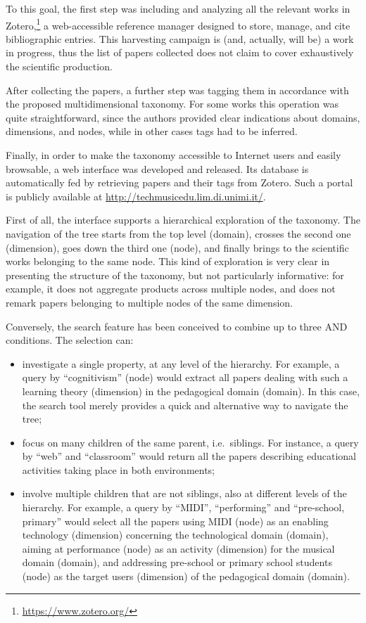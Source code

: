 \documentclass[10pt,journal,compsoc]{IEEEtran}
\begin{document}
To this goal, the first step was including and analyzing all the relevant works in Zotero,\footnote{\url{https://www.zotero.org/}} a web-accessible reference manager designed to store, manage, and cite bibliographic entries. This harvesting campaign is (and, actually, will be) a work in progress, thus the list of papers collected does not claim to cover exhaustively the scientific production.

After collecting the papers, a further step was tagging them in accordance with the proposed multidimensional taxonomy. For some works this operation was quite straightforward, since the authors provided clear indications about domains, dimensions, and nodes, while in other cases tags had to be inferred. 

Finally, in order to make the taxonomy accessible to Internet users and easily browsable, a web interface was developed and released. Its database is automatically fed by retrieving papers and their tags from Zotero. Such a portal is publicly available at \url{http://techmusicedu.lim.di.unimi.it/}.

First of all, the interface supports a hierarchical exploration of the taxonomy. The navigation of the tree starts from the top level (domain), crosses the second one (dimension), goes down the third one (node), and finally brings to the scientific works belonging to the same node. This kind of exploration is very clear in presenting the structure of the taxonomy, but not particularly informative: for example, it does not aggregate products across multiple nodes, and does not remark papers belonging to multiple nodes of the same dimension. 

Conversely, the search feature has been conceived to combine up to three AND conditions. The selection can:

\begin{itemize}
\item investigate a single property, at any level of the hierarchy. For example, a query by ``cognitivism'' (node) would extract all papers dealing with such a learning theory (dimension) in the pedagogical domain (domain). In this case, the search tool merely provides a quick and alternative way to navigate the tree;
\item focus on many children of the same parent, i.e.\ siblings. For instance, a query by ``web'' and ``classroom'' would return all the papers describing educational activities taking place in both environments;
\item involve multiple children that are not siblings, also at different levels of the hierarchy. For example, a query by ``MIDI'', ``performing'' and ``pre-school, primary'' would select all the papers using MIDI (node) as an enabling technology (dimension) concerning the technological domain (domain), aiming at performance (node) as an activity (dimension) for the musical domain (domain), and addressing pre-school or primary school students (node) as the target users (dimension) of the pedagogical domain (domain).
\end{itemize}
\end{document}
